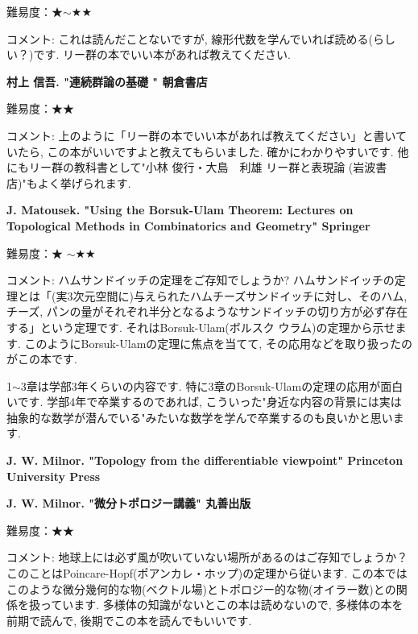 難易度：★$\sim$★★ 　\vspace{-6pt} 

コメント: これは読んだことないですが, 線形代数を学んでいれば読める(らしい？)です. リー群の本でいい本があれば教えてください. 
\vspace{8pt}

\textbf{村上 信吾. "連続群論の基礎 " 朝倉書店}  　\vspace{-6pt} 

難易度：★★ 　\vspace{-6pt} 

コメント: 上のように「リー群の本でいい本があれば教えてください」と書いていたら, この本がいいですよと教えてもらいました. 確かにわかりやすいです. 他にもリー群の教科書として"小林 俊行・大島　利雄 リー群と表現論 (岩波書店)"もよく挙げられます.
\vspace{8pt}

\textbf{J. Matousek. "Using the Borsuk-Ulam Theorem: Lectures on Topological Methods in Combinatorics and Geometry" Springer}  　\vspace{-6pt} 

難易度：★ $\sim$★★\vspace{-6pt} 

コメント: ハムサンドイッチの定理をご存知でしょうか? ハムサンドイッチの定理とは「(実3次元空間に)与えられたハムチーズサンドイッチに対し、そのハム, チーズ, パンの量がそれぞれ半分となるようなサンドイッチの切り方が必ず存在する」という定理です. それはBorsuk-Ulam(ボルスク ウラム)の定理から示せます. 
このようにBorsuk-Ulamの定理に焦点を当てて, その応用などを取り扱ったのがこの本です. 

1$\sim$3章は学部3年くらいの内容です. 特に3章のBorsuk-Ulamの定理の応用が面白いです. 学部4年で卒業するのであれば, こういった"身近な内容の背景には実は抽象的な数学が潜んでいる"みたいな数学を学んで卒業するのも良いかと思います. 
\vspace{8pt}

\textbf{J. W. Milnor. "Topology from the differentiable viewpoint" Princeton University Press}  　\vspace{-6pt} 

\textbf{J. W. Milnor. "微分トポロジー講義" 丸善出版}  　\vspace{-6pt} 

難易度：★★ \vspace{-6pt} 

コメント: 地球上には必ず風が吹いていない場所があるのはご存知でしょうか？ このことはPoincare-Hopf(ポアンカレ・ホップ)の定理から従います. この本ではこのような微分幾何的な物(ベクトル場)とトポロジー的な物(オイラー数)との関係を扱っています. 多様体の知識がないとこの本は読めないので, 多様体の本を前期で読んで, 後期でこの本を読んでもいいです. 
\vspace{8pt}


